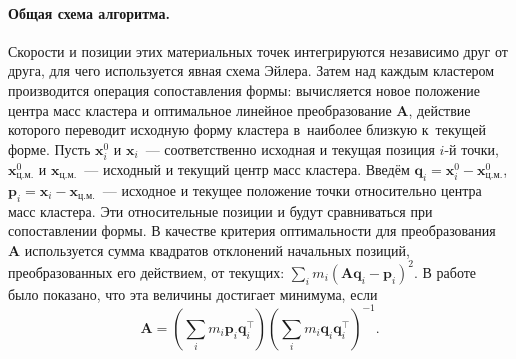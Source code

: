 \documentclass[a4paper, 12pt, titlepage]{extarticle}
\newcommand{\vect}[1]{\mathbf{#1}} %
\newcommand{\matx}[1]{\mathbf{#1}} %
\newcommand{\transposed}{\top} %
\begin{document}
\begin{original}
        \paragraph{Общая схема алгоритма.} Скорости и позиции этих материальных точек интегрируются независимо
        друг от друга, для чего используется явная схема Эйлера. Затем над каждым кластером
        производится операция сопоставления формы: вычисляется новое положение центра масс кластера
        и оптимальное линейное преобразование $\matx A$, действие которого переводит исходную форму
        кластера в~наиболее близкую к~текущей форме. Пусть $\vect{x}^0_i$ и $\vect{x}_i$~---
        соответственно исходная и текущая позиция $i$-й точки,
        $\vect{x}^0_{ц.м.}$ и $\vect{x}_{ц.м.}$~--- исходный и текущий центр масс кластера. Введём
        $\vect{q}_i = \vect{x}^0_i - \vect{x}^0_{ц.м.}$,
        $\vect{p}_i = \vect{x}_i - \vect{x}_{ц.м.}$~--- исходное и текущее положение точки
        относительно центра масс кластера. Эти относительные позиции и будут сравниваться при
        сопоставлении формы. В качестве критерия оптимальности для преобразования $\matx A$
        используется сумма квадратов отклонений начальных позиций, преобразованных его действием, от текущих:
        $\sum_i m_i (\matx A \vect{q}_i - \vect{p}_i )^2$. В работе~\cite{mueller-meshless} было
        показано, что эта величины достигает минимума, если
        \begin{equation}
          \matx A = \left( \sum_i m_i \vect{p}_i \vect{q}_i^\transposed \right)
                    \left( \sum_i m_i \vect{q}_i \vect{q}_i^\transposed \right)^{-1}.
        \end{equation}
\end{original}
\end{document}
